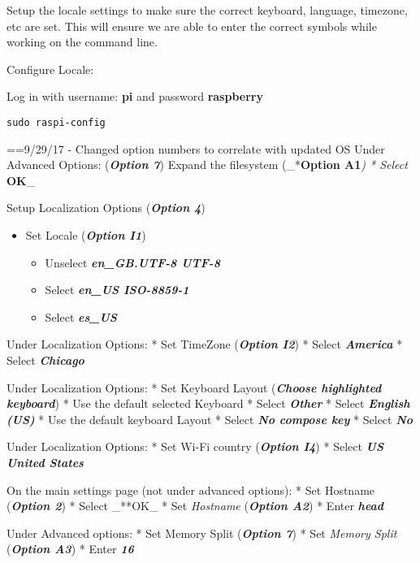 \documentclass[]{article}
\providecommand{\tightlist}{%
  \setlength{\itemsep}{0pt}\setlength{\parskip}{0pt}}
\begin{document}
Setup the locale settings to make sure the correct keyboard, language,
timezone, etc are set. This will ensure we are able to enter the correct
symbols while working on the command line.

Configure Locale:

Log in with username: \textbf{pi} and password \textbf{raspberry}

\begin{verbatim}
sudo raspi-config
\end{verbatim}

==9/29/17 - Changed option numbers to correlate with updated OS Under
Advanced Options: (\emph{\textbf{Option 7}}) Expand the filesystem
(\_*\textbf{Option A1}\emph{) * Select }\textbf{OK}\_

Setup Localization Options (\emph{\textbf{Option 4}})

\begin{itemize}
\tightlist
\item
  Set Locale (\emph{\textbf{Option I1}})

  \begin{itemize}
  \tightlist
  \item
    Unselect \emph{\textbf{en\_GB.UTF-8 UTF-8}}
  \item
    Select \emph{\textbf{en\_US ISO-8859-1}}
  \item
    Select \emph{\textbf{es\_US}}
  \end{itemize}
\end{itemize}

Under Localization Options: * Set TimeZone (\emph{\textbf{Option I2}}) *
Select \emph{\textbf{America}} * Select \emph{\textbf{Chicago}}

Under Localization Options: * Set Keyboard Layout (\emph{\textbf{Choose
highlighted keyboard}}) * Use the default selected Keyboard * Select
\emph{\textbf{Other}} * Select \emph{\textbf{English (US)}} * Use the
default keyboard Layout * Select \emph{\textbf{No compose key}} * Select
\emph{\textbf{No}}

Under Localization Options: * Set Wi-Fi country (\emph{\textbf{Option
I4}}) * Select \emph{\textbf{US United States}}

On the main settings page (not under advanced options): * Set Hostname
(\emph{\textbf{Option 2}}) * Select \_**OK\_ * Set \emph{Hostname}
(\emph{\textbf{Option A2}}) * Enter \emph{\textbf{head}}

Under Advanced options: * Set Memory Split (\emph{\textbf{Option 7}}) *
Set \emph{Memory Split} (\emph{\textbf{Option A3}}) * Enter
\emph{\textbf{16}}
\end{document}
